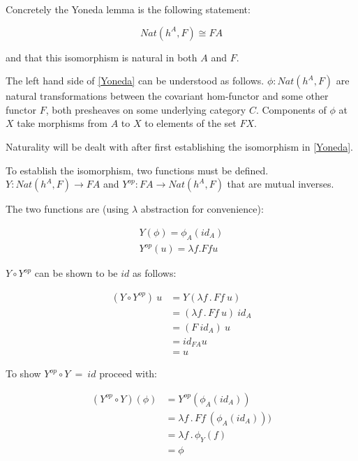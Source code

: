 \documentclass[a4paper,12pt]{article}
\begin{document}
Concretely the Yoneda lemma is the following statement:

\begin{equation}
    Nat(h^{A}, F) \cong FA
    \label{Yoneda}
\end{equation}

and that this isomorphism is natural in both $A$ and $F$.

The left hand side of \ref{Yoneda} can be understood as follows. $\phi : Nat(h^{A},
F)$ are natural transformations between the covariant hom-functor and some other
functor $F$, both presheaves on some underlying category $C$. Components of
$\phi$ at $X$ take morphisms from $A$ to $X$ to elements of the set $FX$.

Naturality will be dealt with after first establishing the isomorphism in
\ref{Yoneda}.

To establish the isomorphism, two functions must be defined. $Y: Nat(h^{A}, F)
\rightarrow FA$ and $Y^{op}: FA \rightarrow Nat(h^{A}, F)$ that are mutual
inverses.

The two functions are (using $\lambda$ abstraction for convenience):

\begin{align*}
    Y(\phi) = \phi_{A}(id_{A}) \\
    Y^{op}(u) = \lambda f . F f u
\end{align*}

$Y \circ Y^{op}$ can be shown to be $id$ as follows:

\begin{align*}
    (Y \circ Y^{op}) \ u &= Y (\lambda f \,.\, F f \ u) \\
    &= (\lambda f \,.\, F f \: u ) \ id_{A} \\
    &= (F \ id_{A}) \ u \\
    &=  id_{FA} u \\
    &= u
\end{align*}

To show $Y^{op} \circ Y \ = \ id$ proceed with:

\begin{align*}
    (Y^{op} \circ Y) (\phi) &= Y^{op} (\phi_{A}(id_{A})) \\
    &= \lambda f \, . \, F f \ (\phi_{A}( id_{A}))) \\
    &= \lambda f \, . \, \phi_{Y}(f) \\
    &= \phi
\end{align*}
\end{document}
